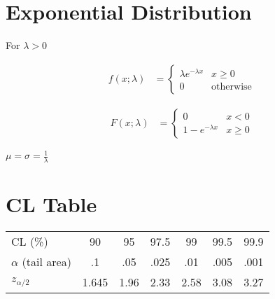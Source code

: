\documentclass[paper=A4, pagesize, fontsize=7pt, DIV=calc]{scrartcl}
\begin{document}
\begin{minipage}[t]{.45\linewidth}
  \section{Exponential Distribution}
  For $\lambda > 0$ \\
  \begin{minipage}{.5\linewidth}
    \begin{align*}
      f(x; \lambda) &= \begin{cases}
        \lambda e^{-\lambda x} & x \ge 0 \\
        0                      & \text{otherwise}
      \end{cases}
    \end{align*}
  \end{minipage}%
  \begin{minipage}{.5\linewidth}
    \begin{align*}
      F(x; \lambda) &= \begin{cases}
        0                  & x < 0 \\
        1 - e^{-\lambda x} & x \ge 0
      \end{cases}
    \end{align*}
  \end{minipage}
  $\mu = \sigma = \frac{1}{\lambda}$

  \section{CL Table}
  \begin{tabular}{l|cccccc}
    CL (\%)              & 90    & 95   & 97.5 & 99   & 99.5 & 99.9 \\
    $\alpha$ (tail area) & .1    & .05  & .025 & .01  & .005 & .001 \\
    $z_{\alpha / 2}$     & 1.645 & 1.96 & 2.33 & 2.58 & 3.08 & 3.27
  \end{tabular}
\end{minipage}
\end{document}
